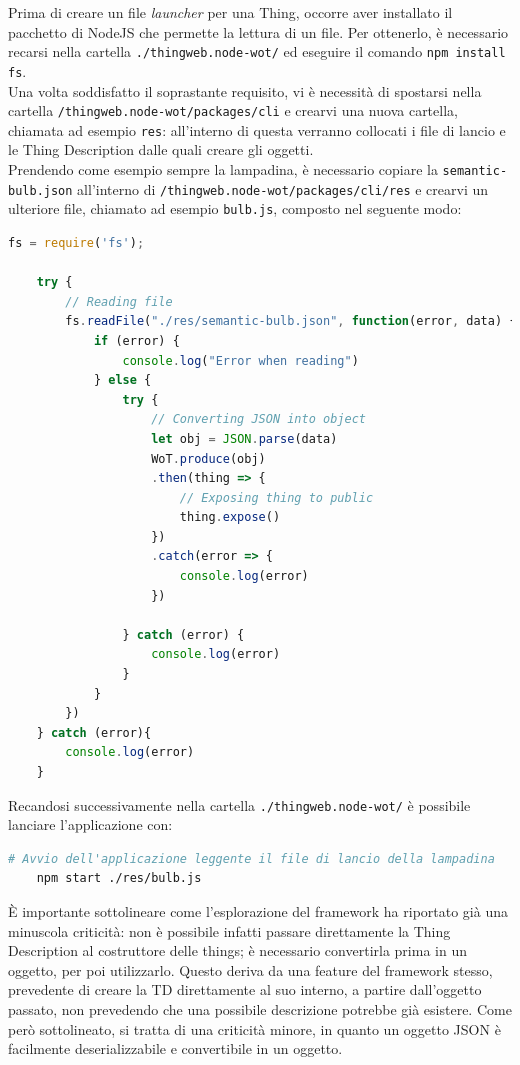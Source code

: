 \documentclass[12pt,a4paper,openright,oneside]{report}
\begin{document}
Prima di creare un file \textit{launcher} per una Thing, occorre aver installato il pacchetto di NodeJS che permette la lettura di un file. Per ottenerlo, è necessario recarsi nella cartella \texttt{./thingweb.node-wot/} ed eseguire il comando \texttt{npm install fs}.\\

Una volta soddisfatto il soprastante requisito, vi è necessità di spostarsi nella cartella \texttt{/thingweb.node-wot/packages/cli} e crearvi una nuova cartella, chiamata ad esempio \texttt{res}: all'interno di questa verranno collocati i file di lancio e le Thing Description dalle quali creare gli oggetti.\\

Prendendo come esempio sempre la lampadina, è necessario copiare la \texttt{semantic-bulb.json} all'interno di \texttt{/thingweb.node-wot/packages/cli/res} e crearvi un ulteriore file, chiamato ad esempio \texttt{bulb.js}, composto nel seguente modo:
\begin{lstlisting}[language=JavaScript]
	fs = require('fs');
	
	try {
		// Reading file
		fs.readFile("./res/semantic-bulb.json", function(error, data) {
			if (error) {
				console.log("Error when reading")
			} else {
				try {
					// Converting JSON into object
					let obj = JSON.parse(data)
					WoT.produce(obj)
					.then(thing => {
						// Exposing thing to public
						thing.expose()
					})
					.catch(error => {
						console.log(error)
					})
					
				} catch (error) {
					console.log(error)
				}
			}
		})
	} catch (error){
		console.log(error)
	}
\end{lstlisting}

Recandosi successivamente nella cartella \texttt{./thingweb.node-wot/} è possibile lanciare l'applicazione con:

\begin{lstlisting}[language=bash]
	# Avvio dell'applicazione leggente il file di lancio della lampadina
	npm start ./res/bulb.js
\end{lstlisting}

È importante sottolineare come l'esplorazione del framework ha riportato già una minuscola criticità: non è possibile infatti passare direttamente la Thing Description al costruttore delle things; è necessario convertirla prima in un oggetto, per poi utilizzarlo. Questo deriva da una feature del framework stesso, prevedente di creare la TD direttamente al suo interno, a partire dall'oggetto passato, non prevedendo che una possibile descrizione potrebbe già esistere. Come però sottolineato, si tratta di una criticità minore, in quanto un oggetto JSON è facilmente deserializzabile e convertibile in un oggetto.\\
\end{document}
